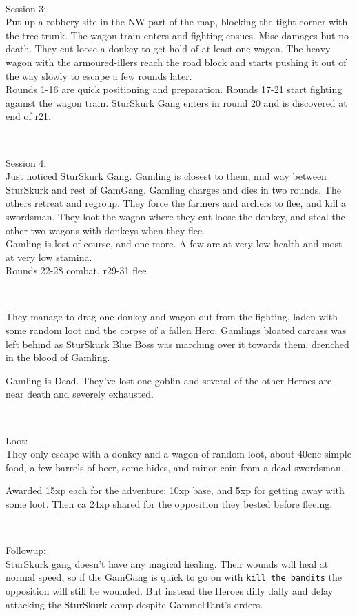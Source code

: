 \

Session 3:\\                                                            %
Put up a robbery site in the NW part of the map, blocking the tight corner with the tree trunk. The wagon train enters and fighting ensues. Misc damages but no death. They cut loose a donkey to get hold of at least one wagon. The heavy wagon with the armoured-illers reach the road block and starts pushing it out of the way slowly to escape a few rounds later.\\
Rounds 1-16 are quick positioning and preparation. Rounds 17-21 start fighting against the wagon train. SturSkurk Gang enters in round 20 and is discovered at end of r21.

\

Session 4:\\                                                            %
Just noticed SturSkurk Gang. Gamling is closest to them, mid way between SturSkurk and rest of GamGang. Gamling charges and dies in two rounds. The others retreat and regroup. They force the farmers and archers to flee, and kill a swordsman. They loot the wagon where they cut loose the donkey, and steal the other two wagons with donkeys when they flee.\\
Gamling is lost of course, and one more. A few are at very low health and most at very low stamina.\\
Rounds 22-28 combat, r29-31 flee

\

They manage to drag one donkey and wagon out from the fighting, laden with some random loot and the corpse of a fallen Hero. Gamlings bloated carcass was left behind as SturSkurk Blue Boss was marching over it towards them, drenched in the blood of Gamling.

Gamling is Dead. They've lost one goblin and several of the other Heroes are near death and severely exhausted.

\

Loot:\\
They only escape with a donkey and a wagon of random loot, about 40enc simple food, a few barrels of beer, some hides, and minor coin from a dead swordsman.

Awarded 15xp each for the adventure: 10xp base, and 5xp for getting away with some loot. Then ca 24xp shared for the opposition they bested before fleeing.

\

Followup:\\
SturSkurk gang doesn't have any magical healing. Their wounds will heal at normal speed, so if the GamGang is quick to go on with \hyperref[02killthebandits]{\texttt{kill the bandits}} the opposition will still be wounded. But instead the Heroes dilly dally and delay attacking the SturSkurk camp despite GammelTant's orders.


